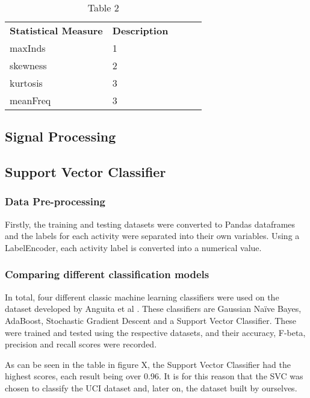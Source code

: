     \begin{table}[]
    \begin{tabular}{|l|l|lll}
    \cline{1-2}
    \textbf{Statistical Measure} & \textbf{Description} &  &  &  \\ \cline{1-2}
    maxInds             & 1           &  &  &  \\ \cline{1-2}
    skewness            & 2           &  &  &  \\ \cline{1-2}
    kurtosis               & 3           &  &  &  \\ \cline{1-2}
    meanFreq            & 3           &  &  &  \\ \cline{1-2}
    \end{tabular}
    \caption{Table 2}
    \label{tab:table-2}
    \end{table}


\subsection{Signal Processing}

\subsection{Support Vector Classifier}
    \subsubsection{Data Pre-processing}
        Firstly, the training and testing datasets were converted to Pandas dataframes and the labels for each activity were separated into their own variables.
        Using a LabelEncoder, each activity label is converted into a numerical value.

    \subsubsection{Comparing different classification models}
        In total, four different classic machine learning classifiers were used on the dataset developed by Anguita et al \cite{Anguita2012}. These classifiers are Gaussian Naïve Bayes,
        AdaBoost, Stochastic Gradient Descent and a Support Vector Classifier. These were trained and tested using the respective datasets, and their accuracy,
        F-beta, precision and recall scores were recorded.

        As can be seen in the table in figure X, the Support Vector Classifier had the highest scores, each result being over 0.96. It is for this reason that the SVC
        was chosen to classify the UCI dataset \cite{Anguita2013} and, later on, the dataset built by ourselves.

